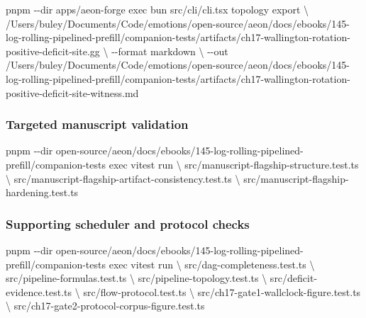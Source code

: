 \documentclass[
  11pt,
]{article}
\newenvironment{Shaded}{}{}
\newcommand{\AttributeTok}[1]{\textcolor[rgb]{0.49,0.56,0.16}{#1}}
\newcommand{\DataTypeTok}[1]{\textcolor[rgb]{0.56,0.13,0.00}{#1}}
\newcommand{\ExtensionTok}[1]{#1}
\newcommand{\NormalTok}[1]{#1}
\begin{document}
\begin{Shaded}
\begin{Highlighting}[]
\ExtensionTok{pnpm} \AttributeTok{{-}{-}dir}\NormalTok{ apps/aeon{-}forge exec bun src/cli/cli.tsx topology export }\DataTypeTok{\textbackslash{}}
\NormalTok{  /Users/buley/Documents/Code/emotions/open{-}source/aeon/docs/ebooks/145{-}log{-}rolling{-}pipelined{-}prefill/companion{-}tests/artifacts/ch17{-}wallington{-}rotation{-}positive{-}deficit{-}site.gg }\DataTypeTok{\textbackslash{}}
  \AttributeTok{{-}{-}format}\NormalTok{ markdown }\DataTypeTok{\textbackslash{}}
  \AttributeTok{{-}{-}out}\NormalTok{ /Users/buley/Documents/Code/emotions/open{-}source/aeon/docs/ebooks/145{-}log{-}rolling{-}pipelined{-}prefill/companion{-}tests/artifacts/ch17{-}wallington{-}rotation{-}positive{-}deficit{-}site{-}witness.md}
\end{Highlighting}
\end{Shaded}

\subsubsection{Targeted manuscript
validation}\label{targeted-manuscript-validation}

\begin{Shaded}
\begin{Highlighting}[]
\ExtensionTok{pnpm} \AttributeTok{{-}{-}dir}\NormalTok{ open{-}source/aeon/docs/ebooks/145{-}log{-}rolling{-}pipelined{-}prefill/companion{-}tests exec vitest run }\DataTypeTok{\textbackslash{}}
\NormalTok{  src/manuscript{-}flagship{-}structure.test.ts }\DataTypeTok{\textbackslash{}}
\NormalTok{  src/manuscript{-}flagship{-}artifact{-}consistency.test.ts }\DataTypeTok{\textbackslash{}}
\NormalTok{  src/manuscript{-}flagship{-}hardening.test.ts}
\end{Highlighting}
\end{Shaded}

\subsubsection{Supporting scheduler and protocol
checks}\label{supporting-scheduler-and-protocol-checks}

\begin{Shaded}
\begin{Highlighting}[]
\ExtensionTok{pnpm} \AttributeTok{{-}{-}dir}\NormalTok{ open{-}source/aeon/docs/ebooks/145{-}log{-}rolling{-}pipelined{-}prefill/companion{-}tests exec vitest run }\DataTypeTok{\textbackslash{}}
\NormalTok{  src/dag{-}completeness.test.ts }\DataTypeTok{\textbackslash{}}
\NormalTok{  src/pipeline{-}formulas.test.ts }\DataTypeTok{\textbackslash{}}
\NormalTok{  src/pipeline{-}topology.test.ts }\DataTypeTok{\textbackslash{}}
\NormalTok{  src/deficit{-}evidence.test.ts }\DataTypeTok{\textbackslash{}}
\NormalTok{  src/flow{-}protocol.test.ts }\DataTypeTok{\textbackslash{}}
\NormalTok{  src/ch17{-}gate1{-}wallclock{-}figure.test.ts }\DataTypeTok{\textbackslash{}}
\NormalTok{  src/ch17{-}gate2{-}protocol{-}corpus{-}figure.test.ts}
\end{Highlighting}
\end{Shaded}
\end{document}
